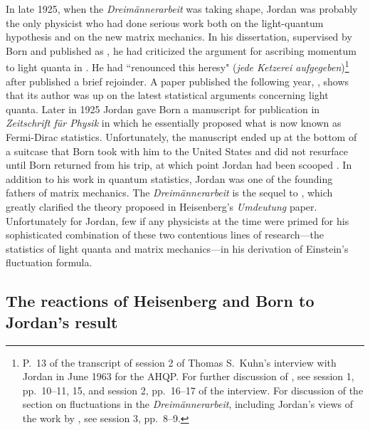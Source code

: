 \documentclass[12pt]{elsart}
\begin{document}
In late 1925, when the {\it Dreim\"annerarbeit} was taking shape, Jordan was probably the only physicist  who had done serious work both on the light-quantum hypothesis and on the new matrix mechanics. In his dissertation, supervised by Born and published as \citep{Jordan 1924}, he had criticized the argument for ascribing momentum to light quanta in \citep{Einstein 1917}. He had ``renounced this heresy" ({\it jede Ketzerei aufgegeben})\footnote{P.\ 13 of the transcript of session 2 of 
Thomas S.\ Kuhn's 
 interview with Jordan in June 1963 for the AHQP.
For further discussion of \citep{Jordan 1924, Jordan 1925}, see session 1, pp.\ 10--11, 15, and session 2, pp.\ 16--17 of the interview. For discussion of the section on fluctuations in the {\it Dreim\"annerarbeit}, including Jordan's views of the work by \citet{Bothe 1923, Bothe 1924}, see session 3, pp.\ 8--9.}  after \citet{Einstein 1925} published a brief rejoinder. A paper published the following year, \citep{Jordan 1925}, shows that its author was up on the latest statistical arguments concerning light quanta. Later in 1925 Jordan gave Born a manuscript for publication in {\it Zeitschrift f\"ur Physik} in which he essentially proposed what is now known as Fermi-Dirac statistics. Unfortunately, the manuscript ended up at the bottom of a suitcase that Born took with him to the United States and did not resurface until Born returned from his trip, at which point Jordan had been scooped \citep[p.\ 49]{Schroer 2007}. In addition to his work in quantum statistics, Jordan was one of the founding fathers of matrix mechanics. The {\it Dreim\"annerarbeit} is the sequel to \citep{Born and Jordan 1925}, which greatly clarified the theory proposed in Heisenberg's {\it Umdeutung} paper. Unfortunately for Jordan, few if any physicists at the time were primed for his sophisticated combination of these two contentious lines of research---the statistics of light quanta and matrix mechanics---in his derivation of Einstein's fluctuation formula.

\subsection{The reactions of Heisenberg and Born to Jordan's result}
\end{document}

